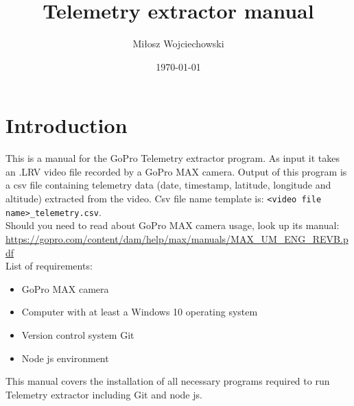 \documentclass[a4paper,12pt]{book}
\begin{document}
\author{Miłosz Wojciechowski}
\title{Telemetry extractor manual}
\date{\today}


\maketitle
\pagebreak
{}
\renewcommand{\labelenumii}{\arabic{enumi}.\arabic{enumii}}
\tableofcontents
\chapter{Introduction}
This is a manual for the GoPro Telemetry extractor program. As input it takes an .LRV video file recorded by a GoPro MAX camera. Output of this program is a csv file containing telemetry data (date, timestamp, latitude, longitude and altitude) extracted from the video. Csv file name template is: \verb|<video file name>_telemetry.csv|. \\

Should you need to read about GoPro MAX camera usage, look up its manual: \url{https://gopro.com/content/dam/help/max/manuals/MAX_UM_ENG_REVB.pdf} \\
List of requirements:
\begin{itemize}
	\item GoPro MAX camera
	\item Computer with at least a Windows 10 operating system
	\item Version control system Git
	\item Node js environment
\end{itemize}
This manual covers the installation of all necessary programs required to run Telemetry extractor including Git and node js.
\end{document}
